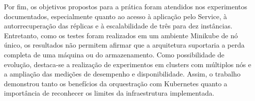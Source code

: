 Por fim, os objetivos propostos para a prática foram atendidos nos experimentos documentados, especialmente quanto ao acesso à aplicação pelo Service, à autorrecuperação das réplicas e à escalabilidade de três para dez instâncias. Entretanto, como os testes foram realizados em um ambiente Minikube de nó único, os resultados não permitem afirmar que a arquitetura suportaria a perda completa de uma máquina ou do armazenamento. Como possibilidade de evolução, destaca-se a realização de experimentos em clusters com múltiplos nós e a ampliação das medições de desempenho e disponibilidade. Assim, o trabalho demonstrou tanto os benefícios da orquestração com Kubernetes quanto a importância de reconhecer os limites da infraestrutura implementada.
